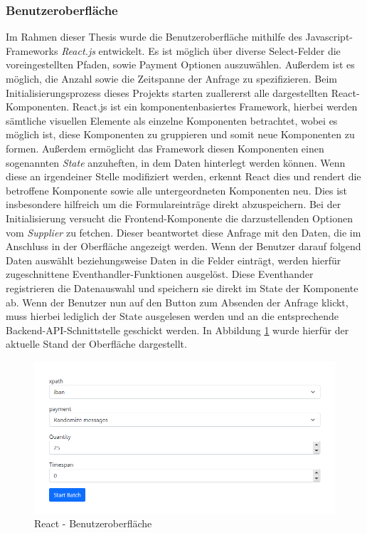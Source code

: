 \subsubsection{Benutzeroberfläche}
Im Rahmen dieser Thesis wurde die Benutzeroberfläche mithilfe des Javascript-Frameworks \emph{React.js} entwickelt. Es ist möglich über diverse Select-Felder die voreingestellten Pfaden, sowie Payment Optionen auszuwählen. Außerdem ist es möglich, die Anzahl sowie die Zeitspanne der Anfrage zu spezifizieren. Beim Initialisierungsprozess dieses Projekts starten zuallererst alle dargestellten React-Komponenten. React.js ist ein komponentenbasiertes Framework, hierbei werden sämtliche visuellen Elemente als einzelne Komponenten betrachtet, wobei es möglich ist, diese Komponenten zu gruppieren und somit neue Komponenten zu formen. Außerdem ermöglicht das Framework diesen Komponenten einen sogenannten \emph{State} anzuheften, in dem Daten hinterlegt werden können. Wenn diese an irgendeiner Stelle modifiziert werden, erkennt React dies und rendert die betroffene Komponente sowie alle untergeordneten Komponenten neu. Dies ist insbesondere hilfreich um die Formulareinträge direkt abzuspeichern. Bei der Initialisierung versucht die Frontend-Komponente die darzustellenden Optionen vom \emph{Supplier} zu fetchen. Dieser beantwortet diese Anfrage mit den Daten, die im Anschluss in der Oberfläche angezeigt werden. Wenn der Benutzer darauf folgend Daten auswählt beziehungsweise Daten in die Felder einträgt, werden hierfür zugeschnittene Eventhandler-Funktionen ausgelöst. Diese Eventhander registrieren die Datenauswahl und speichern sie direkt im State der Komponente ab. Wenn der Benutzer nun auf den Button zum Absenden der Anfrage klickt, muss hierbei lediglich der State ausgelesen werden und an die entsprechende Backend-API-Schnittstelle geschickt werden. In Abbildung \ref{fig:reactUi}  wurde hierfür der aktuelle Stand der Oberfläche dargestellt.

\begin{figure}[ht!]
	\centering
	\includegraphics[width=.9\linewidth]{kapitel/problemloesung/implementierung/_img/react01}
	\caption[React - Benutzeroberfläche]{React - Benutzeroberfläche}
	\label{fig:reactUi}
\end{figure}

